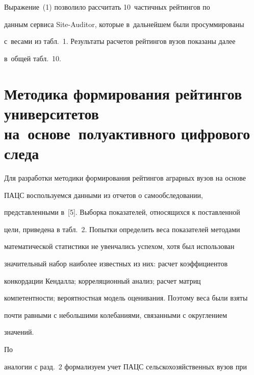 

 


 \vspace*{-4pt}


 


 \noindent


    Выражение~(1) позволило рассчитать 10~частичных рейтингов по 


данным сервиса Site-Auditor, которые в~дальнейшем были просуммированы 


с~весами из табл.~1. Результаты расчетов рейтингов вузов показаны далее 


в~общей табл.~10.





\section{Методика формирования рейтингов университетов на~основе~полуактивного цифрового следа}





  Для разработки методики формирования рейтингов аграрных вузов на основе 


ПАЦС воспользуемся данными из отчетов о самообследовании, 


представленными в~[5]. Выборка показателей, относящихся к поставленной 


цели, приведена в табл.~2. Попытки определить веса показателей методами 


математической статистики не увенчались успехом, хотя был использован 


значительный набор наиболее известных из них: расчет коэффициентов 


конкордации Кендалла; корреляционный анализ; расчет матриц 


компетентности; вероятностная модель оценивания. Поэтому веса были взяты 


почти равными с небольшими колебаниями, связанными с округлением 


значений.











  По 


аналогии с разд.~2 формализуем учет ПАЦС сельскохозяйственных вузов при 


